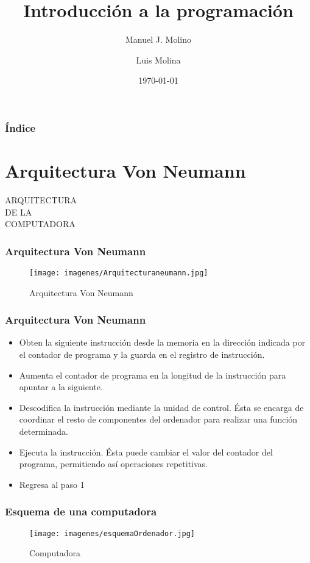 \documentclass{beamer}
\title{Introducción a la programación}
\author{Manuel J. Molino \and Luis Molina}
\institute{IES Virgen del Carmen \and Departamento de informatica}
\date{\today}
\begin{document}
\begin{frame}
\titlepage %
\end{frame} 

\begin{frame}
\frametitle{Índice}
\tableofcontents
\end{frame} 


\section{Arquitectura Von Neumann}
\begin{frame}
\begin{center}
\begin{Huge}
ARQUITECTURA\\DE LA\\\vspace{0.7cm} COMPUTADORA
\end{Huge}
\end{center}
\end{frame} 

\begin{frame}
\frametitle{Arquitectura Von Neumann} 
\begin{figure}
\texttt{[image: imagenes/Arquitecturaneumann.jpg]} 
\caption{Arquitectura Von Neumann}
\end{figure} 
\end{frame}

\begin{frame}
\frametitle{Arquitectura Von Neumann}
\begin{itemize}[<+->]
\item Obten la siguiente instrucción desde la memoria en la dirección indicada por el contador de programa y la guarda en el registro de instrucción.
\item Aumenta el contador de programa en la longitud de la instrucción para apuntar a la siguiente.
\item Descodifica la instrucción mediante la unidad de control. Ésta se encarga de coordinar el resto de componentes del ordenador para realizar una función determinada.
\item Ejecuta la instrucción. Ésta puede cambiar el valor del contador del programa, permitiendo así operaciones repetitivas.
\item Regresa al paso 1
\end{itemize} 
\end{frame}

\begin{frame}
\frametitle{Esquema de una computadora} 
\begin{figure}
\texttt{[image: imagenes/esquemaOrdenador.jpg]} 
\caption{Computadora}
\end{figure} 
\end{frame}
\end{document}

